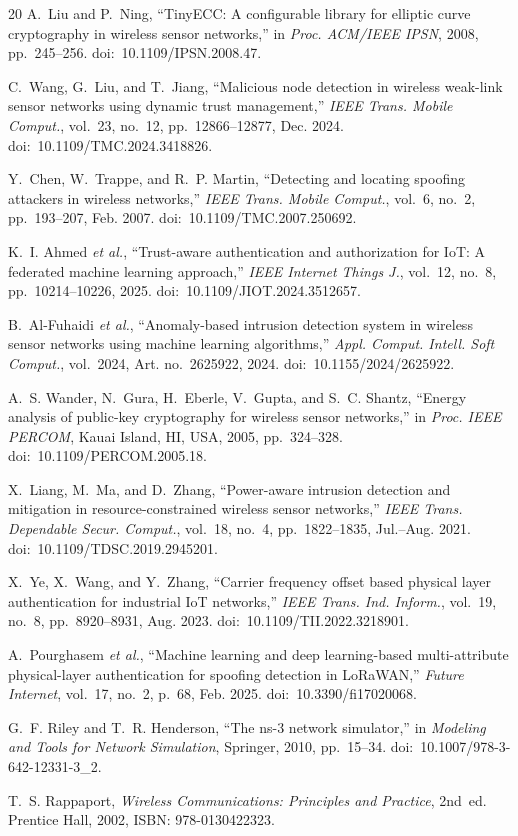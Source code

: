 \documentclass[conference]{IEEEtran}
\begin{document}
\begin{thebibliography}{20}
A.~Liu and P.~Ning, ``TinyECC: A configurable library for elliptic curve cryptography in wireless sensor networks,'' in \textit{Proc. ACM/IEEE IPSN}, 2008, pp.~245--256. doi:~10.1109/IPSN.2008.47.

C.~Wang, G.~Liu, and T.~Jiang, ``Malicious node detection in wireless weak-link sensor networks using dynamic trust management,'' \textit{IEEE Trans. Mobile Comput.}, vol.~23, no.~12, pp.~12866--12877, Dec. 2024. doi:~10.1109/TMC.2024.3418826.

Y.~Chen, W.~Trappe, and R.~P. Martin, ``Detecting and locating spoofing attackers in wireless networks,'' \textit{IEEE Trans. Mobile Comput.}, vol.~6, no.~2, pp.~193--207, Feb. 2007. doi:~10.1109/TMC.2007.250692.

K.~I. Ahmed \textit{et al.}, ``Trust-aware authentication and authorization for IoT: A federated machine learning approach,'' \textit{IEEE Internet Things J.}, vol.~12, no.~8, pp.~10214--10226, 2025. doi:~10.1109/JIOT.2024.3512657.

B.~Al-Fuhaidi \textit{et al.}, ``Anomaly-based intrusion detection system in wireless sensor networks using machine learning algorithms,'' \textit{Appl. Comput. Intell. Soft Comput.}, vol.~2024, Art. no.~2625922, 2024. doi:~10.1155/2024/2625922.

A.~S. Wander, N.~Gura, H.~Eberle, V.~Gupta, and S.~C. Shantz, ``Energy analysis of public-key cryptography for wireless sensor networks,'' in \textit{Proc. IEEE PERCOM}, Kauai Island, HI, USA, 2005, pp.~324--328. doi:~10.1109/PERCOM.2005.18.

X.~Liang, M.~Ma, and D.~Zhang, ``Power-aware intrusion detection and mitigation in resource-constrained wireless sensor networks,'' \textit{IEEE Trans. Dependable Secur. Comput.}, vol.~18, no.~4, pp.~1822--1835, Jul.--Aug. 2021. doi:~10.1109/TDSC.2019.2945201.

X.~Ye, X.~Wang, and Y.~Zhang, ``Carrier frequency offset based physical layer authentication for industrial IoT networks,'' \textit{IEEE Trans. Ind. Inform.}, vol.~19, no.~8, pp.~8920--8931, Aug. 2023. doi:~10.1109/TII.2022.3218901.

A.~Pourghasem \textit{et al.}, ``Machine learning and deep learning-based multi-attribute physical-layer authentication for spoofing detection in LoRaWAN,'' \textit{Future Internet}, vol.~17, no.~2, p.~68, Feb. 2025. doi:~10.3390/fi17020068.

G.~F. Riley and T.~R. Henderson, ``The ns-3 network simulator,'' in \textit{Modeling and Tools for Network Simulation}, Springer, 2010, pp.~15--34. doi:~10.1007/978-3-642-12331-3\_2.

T.~S. Rappaport, \textit{Wireless Communications: Principles and Practice}, 2nd~ed. Prentice Hall, 2002, ISBN: 978-0130422323.

\end{thebibliography}
\end{document}
